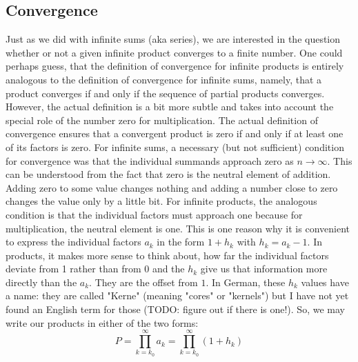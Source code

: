 \subsection{Convergence}
Just as we did with infinite sums (aka series), we are interested in the question whether or not a given infinite product converges to a finite number. One could perhaps guess, that the definition of convergence for infinite products is entirely analogous to the definition of convergence for infinite sums, namely, that a product converges if and only if the sequence of partial products converges. However, the actual definition is a bit more subtle and takes into account the special role of the number zero for multiplication. The actual definition of convergence ensures that a convergent product is zero if and only if at least one of its factors is zero. 
For infinite sums, a necessary (but not sufficient) condition for convergence was that the individual summands approach zero as $n \rightarrow \infty$. This can be understood from the fact that zero is the neutral element of addition. Adding zero to some value changes nothing and adding a number close to zero changes the value only by a little bit. For infinite products, the analogous condition is that the individual factors must approach one because for multiplication, the neutral element is one. This is one reason why it is convenient to express the individual factors $a_k$ in the form $1 + h_k$ with $h_k = a_k - 1$. In products, it makes more sense to think about, how far the individual factors deviate from 1 rather than from 0 and the $h_k$ give us that information more directly than the $a_k$. They are the offset from $1$. In German, these $h_k$ values have a name: they are called "Kerne" (meaning "cores" or "kernels") but I have not yet found an English term for those (TODO: figure out if there is one!). So, we may write our products in either of the two forms:
\begin{equation}
 P = \prod_{k=k_0}^{\infty} a_k = \prod_{k=k_0}^{\infty} (1 + h_k) 
\end{equation}




